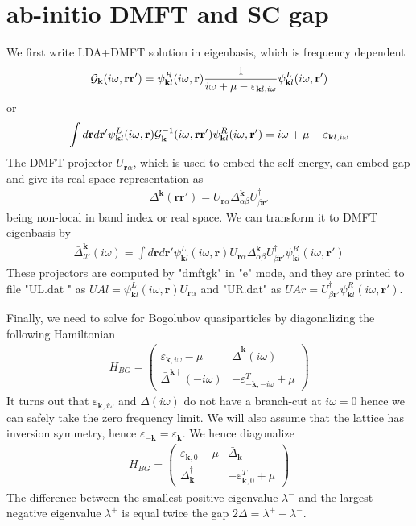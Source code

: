 \documentclass[twocolumn,prb,preprintnumbers,amsmath,amssymb,floatfix]{revtex4}
\renewcommand{\vr}{{\mathbf{r}}} \newcommand{\vk}{{\mathbf{k}}}
\newcommand{\cG}{{\cal G}}
\begin{document}
\section{ab-initio DMFT and SC gap}
We first write LDA+DMFT solution in eigenbasis, which is frequency
dependent
\begin{eqnarray}
\cG_{\vk}(i\omega,\vr\vr') = \psi^R_{\vk l}(i\omega,\vr)\frac{1}{i\omega+\mu-\varepsilon_{\vk l, i\omega}} \psi^L_{\vk l}(i\omega,\vr')
\end{eqnarray}
or
\begin{eqnarray}
\int d\vr d\vr' \psi^L_{\vk l}(i\omega,\vr) \cG^{-1}_{\vk}(i\omega,\vr\vr') \psi^R_{\vk l}(i\omega,\vr')= {i\omega+\mu-\varepsilon_{\vk l, i\omega}} 
\nonumber
\end{eqnarray}
The DMFT projector $U_{\vr\alpha}$, which is used to embed the
self-energy, can embed gap and give its real space representation as
\begin{eqnarray}
\Delta^\vk(\vr\vr')=U_{\vr\alpha}\Delta^\vk_{\alpha\beta}U^\dagger_{\beta\vr'}  
\end{eqnarray}
being non-local in band index or real space.
We can transform it to DMFT eigenbasis by
\begin{eqnarray}
\bar{\Delta}^\vk_{ll'}(i\omega)=\int d\vr d\vr' \psi^L_{\vk l}(i\omega,\vr) U_{\vr\alpha}\Delta^\vk_{\alpha\beta}U^\dagger_{\beta\vr'}   \psi^R_{\vk l}(i\omega,\vr')
\end{eqnarray}
These projectors are computed by "dmftgk" in "e" mode, and they are
printed to file "UL.dat " as $UAl=\psi^L_{\vk l}(i\omega,\vr)
U_{\vr\alpha}$ and "UR.dat" as $UAr=U^\dagger_{\beta\vr'}   \psi^R_{\vk l}(i\omega,\vr')$.

Finally, we need to solve for Bogolubov quasiparticles by
diagonalizing the following Hamiltonian
\begin{eqnarray}
H_{BG}=
\left(
\begin{array}{cc}
\varepsilon_{\vk,i\omega}-\mu & \bar{\Delta}^\vk(i\omega)\\
\bar{\Delta}^{\vk \dagger}(-i\omega) & -\varepsilon_{-\vk,-i\omega}^T+\mu
\end{array}
\right)
\end{eqnarray}
It turns out that $\varepsilon_{\vk,i\omega}$ and
$\bar{\Delta}(i\omega)$ do not have a branch-cut at $i\omega=0$ hence
we can safely take the zero frequency limit. We will also assume that
the lattice has inversion symmetry, hence
$\varepsilon_{-\vk}=\varepsilon_{\vk}$. We hence diagonalize
\begin{eqnarray}
H_{BG}=
\left(
\begin{array}{cc}
\varepsilon_{\vk,0}-\mu & \bar{\Delta}_\vk\\
\bar{\Delta}_{\vk}^{\dagger} & -\varepsilon_{\vk,0}^T+\mu
\end{array}
\right)
\end{eqnarray}
The difference between the smallest positive eigenvalue $\lambda^-$ and the
largest negative eigenvalue $\lambda^+$ is equal twice the gap $2\Delta=\lambda^+-\lambda^-$.
\end{document}
